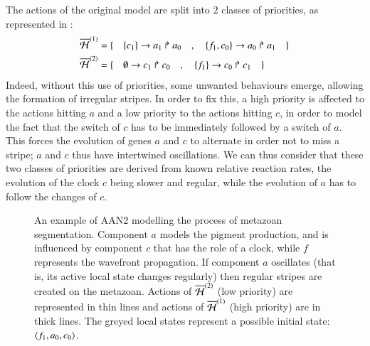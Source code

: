 The actions of the original model are split into $2$ classes of priorities, as represented in :
\begin{align*}
  \overline{\mathcal{H}}^{(1)} = \{ \quad
    & \{c_1\}\rightarrow a_1\Rsh a_0 \quad , \quad
    \{f_1, c_0\}\rightarrow a_0\Rsh a_1
  \quad \} \\
  \overline{\mathcal{H}}^{(2)} = \{ \quad
    & \emptyset\rightarrow c_1\Rsh c_0 \quad , \quad
    \{f_1\}\rightarrow c_0\Rsh c_1
  \quad \} \\
\end{align*}
Indeed, without this use of priorities,
some unwanted behaviours emerge, allowing the formation of irregular stripes.
In order to fix this, a high priority is affected to the actions hitting $a$
and a low priority to the actions hitting $c$,
in order to model the fact that the switch of $c$ has to be immediately followed by
a switch of $a$.
This forces the evolution of genes $a$ and $c$
to alternate in order not to miss a stripe;
$a$ and $c$ thus have intertwined oscillations.
We can thus consider that these two classes of priorities
are derived from known relative reaction rates,
the evolution of the clock $c$ being slower and regular,
while the evolution of $a$ has to follow the changes of $c$.

\begin{figure}[p]
  \centering
  \caption{
  \label{fig:metazoan-php}
    An example of AAN$2$
    modelling the process of metazoan segmentation.
    Component $a$ models the pigment production, and is influenced by
    component $c$ that has the role of a clock,
    while $f$ represents the wavefront propagation.
    If component $a$ oscillates (that is, its active local state changes regularly)
    then regular stripes are created on the metazoan.
    Actions of $\overline{\mathcal{H}}^{(2)}$ (low priority) are represented in thin lines
    and actions of $\overline{\mathcal{H}}^{(1)}$ (high priority) are in thick lines.
    The greyed local states represent a possible initial state:
    $\mbox{$\langle f_1, a_0, c_0 \rangle$}$.
  }
\end{figure}

